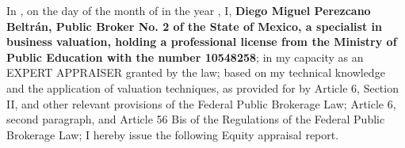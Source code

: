 
In \lugarInforme, on the \numberstringnum{\diainforme} day of the month of \monthname[\mesinforme] in the year \numberstringnum{\annoinforme}, I, \textbf{\textcolor{principal}{Diego Miguel Perezcano Beltrán, Public Broker No. 2 of the State of Mexico, a specialist in business valuation, holding a professional license from the Ministry of Public Education with the number 10548258}}; in my capacity as an EXPERT APPRAISER granted by the law; based on my technical knowledge and the application of valuation techniques, as provided for by Article 6, Section II, and other relevant provisions of the Federal Public Brokerage Law; Article 6, second paragraph, and Article 56 Bis of the Regulations of the Federal Public Brokerage Law; I hereby issue the following Equity appraisal report.